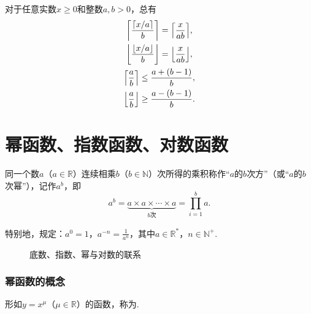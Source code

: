\begin{property}
对于任意实数\(x \geq 0\)和整数\(a,b>0\)，总有\begin{gather}
\ceil*{\frac{\ceil{x/a}}{b}} = \ceil*{\frac{x}{ab}}, \\
\floor*{\frac{\floor{x/a}}{b}} = \floor*{\frac{x}{ab}}, \\
\ceil*{\frac{a}{b}} \leq \frac{a+(b-1)}{b}, \\
\floor*{\frac{a}{b}} \geq \frac{a-(b-1)}{b}.
\end{gather}
\end{property}

\section{幂函数、指数函数、对数函数}
\begin{definition}
同一个数\(a\)（\(a\in\mathbb{R}\)）连续相乘\(b\)（\(b\in\mathbb{N}\)）次所得的乘积称作“\(a\)的\(b\)次方”（或“\(a\)的\(b\)次幂”），记作\(a^b\)，即\[
a^b = \underbrace{a \times a \times \dotsm \times a}_{b\text{次}} = \prod\limits_{i=1}^b a.
\]

特别地，规定：\(a^0 = 1\)，\(a^{-n} = \frac{1}{a^n}\)，其中\(a\in\mathbb{R}^*\)，\(n\in\mathbb{N}^+\).
\end{definition}

\begin{figure}[ht]
\centering
{}
\caption{底数、指数、幂与对数的联系}
\label{figure:函数.底数、指数、幂与对数的联系}
\end{figure}

\subsubsection{幂函数的概念}
\begin{definition}[幂函数]
形如\(y=x^{\mu}\)（\(\mu \in \mathbb{R}\)）的函数，称为.
\end{definition}

